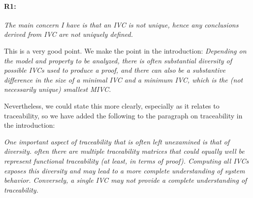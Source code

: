 \documentclass{article}
\begin{document}
\newcommand{\true}{\textsc{True}}
\newcommand{\false}{\textsc{False}}

\paragraph{R1:} \textit{The main concern I have is that an IVC is not unique, hence any conclusions derived from IVC are not uniquely defined.}

\vspace{0.05in}

\noindent This is a very good point.  We make the point in the introduction: \textit{Depending on the model and property to be analyzed, there is often substantial diversity of possible IVCs used to produce a proof, and there can also be a substantive difference in the size of a {\em minimal} IVC and a {\em minimum} IVC, which is the (not necessarily unique) smallest MIVC.}

Nevertheless, we could state this more clearly, especially as it relates to traceability, so we have added the following to the paragraph on traceability in the introduction:

\textit{One important aspect of traceability that is often left unexamined is that of diversity. often there are multiple traceability matrices that could equally well be represent functional traceability (at least, in terms of proof).  Computing all IVCs exposes this diversity and may lead to a more complete understanding of system behavior.  Conversely, a single IVC may not provide a complete understanding of traceability.}


\end{document}
